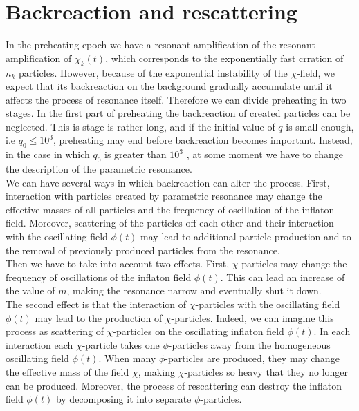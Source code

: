 \documentclass[11pt,a4paper,twoside]{book}
\begin{document}
\section{Backreaction and rescattering}
In the preheating epoch we have a resonant amplification of the resonant amplification of $ \chi_{k}(t) $, which corresponds to the exponentially fast crration of $ n_{k} $ particles. However, because of the exponential  instability of the $\chi$-field, we expect that its backreaction on the background gradually accumulate until it affects the process of resonance itself. Therefore we can divide preheating in two stages. In  the first part of preheating  the backreaction of created particles can be neglected. This is stage is rather long, and if the initial value of $ q $ is small enough, i.e $ q_{0} \le 10^{3} $, preheating may end before backreaction becomes important. Instead, in the case in which $ q_{0} $ is greater than $ 10^{3}$																																															
, at some moment we have to change the description of the parametric resonance.\\
We can have several ways in which backreaction can alter the process. First, interaction with particles created by parametric resonance may change the effective masses of all particles and the frequency of oscillation of the inflaton field. Moreover, scattering of the particles off each other and their interaction with the oscillating field $ \phi(t) $ may lead to additional particle production and to the removal of previously produced particles from the resonance.\\
Then we have to take into account two effects. First, $\chi$-particles may change the frequency of oscillations of the inflaton field $ \phi(t) $. This can lead an increase of the value of $ m $, making the resonance narrow and eventually shut it down.\\
The second effect is that the interaction of $ \chi $-particles with the oscillating field $ \phi(t) $ may lead to the production of $ \chi $-particles. Indeed, we can imagine this process as scattering of $ \chi $-particles on the oscillating inflaton field $ \phi(t) $. In each interaction each $\chi$-particle takes one $\phi$-particles away from the homogeneous oscillating field $ \phi(t) $. When many $\phi$-particles are produced, they may change the effective mass of the field $\chi$, making $ \chi $-particles so heavy that they no longer can be produced. Moreover, the process of rescattering can destroy the inflaton field $ \phi(t) $ by decomposing it into separate $ \phi $-particles.
\end{document}
